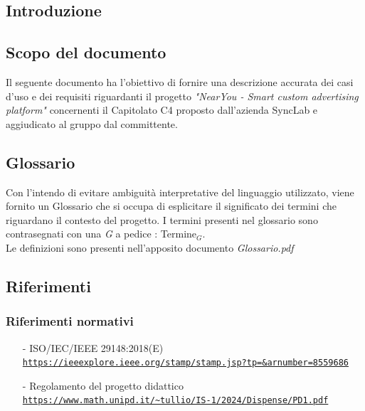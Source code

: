 \documentclass[11pt]{article}
\begin{document}
\newpage
\begin{justify}

\section{Introduzione}
\label{sec:intro}

\subsection{Scopo del documento}

Il seguente documento ha l'obiettivo di fornire una descrizione accurata dei casi d'uso e dei requisiti riguardanti il progetto \textit{"NearYou - 
Smart custom advertising platform"} concernenti il Capitolato C4 proposto dall'azienda SyncLab e aggiudicato al gruppo dal committente.


\subsection{Glossario}
Con l'intendo di evitare ambiguità interpretative del linguaggio utilizzato, viene fornito un Glossario che si occupa di esplicitare il significato dei termini che riguardano il contesto del progetto. I termini presenti nel glossario sono contrasegnati con una \textit{G} a pedice : Termine$_G$.\\
Le definizioni sono presenti nell'apposito documento \textit{Glossario.pdf}


\subsection{Riferimenti}

\subsubsection{Riferimenti normativi}
\begin{itemize}
    \item[-] ISO/IEC/IEEE 29148:2018(E) \\
    \textcolor{blue}{\texttt{\url{https://ieeexplore.ieee.org/stamp/stamp.jsp?tp=&arnumber=8559686}}}
    
    \item[-] Regolamento del progetto didattico  \\
    \textcolor{blue}{\texttt{\url{https://www.math.unipd.it/~tullio/IS-1/2024/Dispense/PD1.pdf}}}
    
\end{itemize}

\end{justify}
\end{document}
